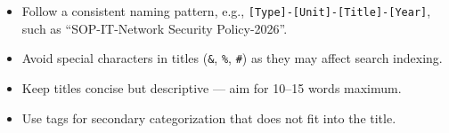 \vspace{6pt}

\begin{ugBestPractice}
  \begin{itemize}[leftmargin=14pt]
    \item Follow a consistent naming pattern, e.g.,
          \texttt{[Type]-[Unit]-[Title]-[Year]}, such as
          ``SOP-IT-Network Security Policy-2026''.
    \item Avoid special characters in titles (\texttt{\&},
          \texttt{\%}, \texttt{\#}) as they may affect search
          indexing.
    \item Keep titles concise but descriptive --- aim for
          10--15 words maximum.
    \item Use tags for secondary categorization that does not
          fit into the title.
  \end{itemize}
\end{ugBestPractice}

\newpage

